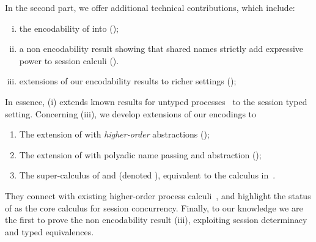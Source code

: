 \documentclass[preprint,11pt]{elsarticle}
\begin{document}
{In the second part, we offer additional technical contributions, which include: 
\begin{enumerate}[(i)]
\item
the encodability of \HO into \sessp (); 
\item
a non encodability result showing that shared names strictly add expressive power to session calculi ().
\item
extensions of our encodability results to richer settings ();
\end{enumerate}
In essence, (i) extends known  results for untyped processes~\cite{SangiorgiD:expmpa} to the session typed setting.
Concerning (iii), we develop extensions of our encodings to 
\begin{enumerate}[-]
\item The extension of \HOp with \emph{higher-order} abstractions (\HOpp); 
\item The extension of \HOp with polyadic name passing and abstraction (\PHOp); 
\item The super-calculus of \HOpp and \PHOp (denoted \PHOpp), equivalent to the calculus in~\cite{tlca07}.
\end{enumerate}

They connect \HOp with existing higher-order process calculi~\cite{tlca07}, and  
 highlight the status of \HO as the core calculus for session concurrency.
Finally, %
to our knowledge we are the first to prove 
the non encodability result (iii),
exploiting session determinacy and typed equivalences.




}
\end{document}
